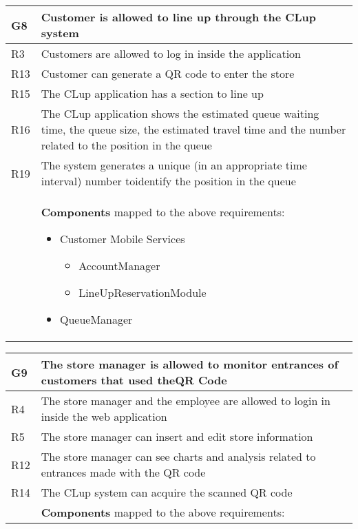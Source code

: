 \begin{center}
    {\renewcommand{\arraystretch}{1.5}
    \begin{longtable}{L{2.5cm}L{12cm}}
        \hline
        \textbf{G8} & \textbf{Customer is allowed to line up through the CLup system} \\
        \hline
         R3 & Customers are allowed to log in inside the application \\
        \hline
         R13 & Customer can generate a QR code to enter the store \\
        \hline
         R15 & The CLup application has a section to line up \\
        \hline
         R16 & The CLup application shows the estimated queue waiting time, the queue size, the estimated travel time and the number related to the position in the queue \\
        \hline
         R19 & The system generates a unique (in an appropriate time interval) number toidentify the position in the queue \\
        \hline
         & \textbf{Components} mapped to the above requirements:

        \medskip 
        \begin{itemize}
            \item Customer Mobile Services \begin{itemize}
                \item AccountManager
                \item LineUpReservationModule
            \end{itemize}
            \item QueueManager
        \end{itemize} \\
        \hline
    \end{longtable}}

    {\renewcommand{\arraystretch}{1.5}
    \begin{longtable}{L{2.5cm}L{12cm}}
        \hline
        \textbf{G9} & \textbf{The store manager is allowed to monitor entrances of customers that used theQR Code} \\
        \hline
         R4 & The store manager and the employee are allowed to login in inside the web application \\
        \hline
         R5 & The store manager can insert and edit store information \\
        \hline
         R12 & The store manager can see charts and analysis related to entrances made with the QR code \\
        \hline
         R14 & The CLup system can acquire the scanned QR code \\
        \hline
         & \textbf{Components} mapped to the above requirements:


\end{longtable}}
\end{center}
